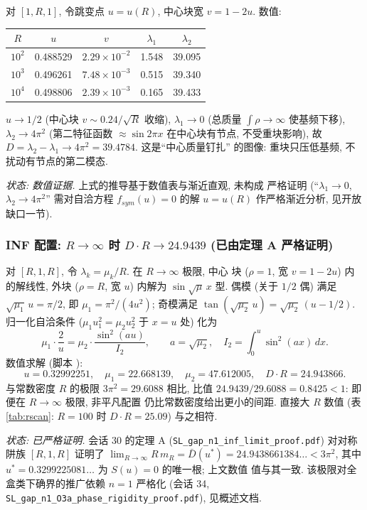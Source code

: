 \documentclass[UTF8]{ctexart}
\begin{document}
对 $[1, R, 1]$, 令跳变点 $u = u(R)$, 中心块宽 $v = 1 - 2u$. 数值:
\begin{center}
\begin{tabular}{c|cccc}
	$R$ & $u$ & $v$ & $\lambda_1$ & $\lambda_2$ \\\hline
	$10^2$ & 0.488529 & $2.29\times10^{-2}$ & 1.548 & 39.095\\
	$10^3$ & 0.496261 & $7.48\times10^{-3}$ & 0.515 & 39.340\\
	$10^4$ & 0.498806 & $2.39\times10^{-3}$ & 0.165 & 39.433\\
\end{tabular}
\end{center}
$u \to 1/2$ (中心块 $v \sim 0.24/\sqrt{R}$ 收缩), $\lambda_1 \to 0$
(总质量 $\int\rho \to \infty$ 使基频下移), $\lambda_2 \to 4\pi^2$
(第二特征函数 $\approx \sin 2\pi x$ 在中心块有节点, 不受重块影响),
故 $D = \lambda_2 - \lambda_1 \to 4\pi^2 = 39.4784$. 这是``中心质量钉扎''
的图像: 重块只压低基频, 不扰动有节点的第二模态.

\noindent\emph{状态: 数值证据.} 上式的推导基于数值表与渐近直观, 未构成
严格证明 (``$\lambda_1\to0$, $\lambda_2\to4\pi^2$'' 需对自洽方程
$f_{sym}(u)=0$ 的解 $u=u(R)$ 作严格渐近分析, 见开放缺口一节).

\subsubsection{INF 配置: \texorpdfstring{$R \to \infty$}{R-inf} 时 \texorpdfstring{$D\cdot R \to 24.9439$}{DR-24.9439} (已由定理 A 严格证明)}

对 $[R, 1, R]$, 令 $\lambda_k = \mu_k/R$. 在 $R \to \infty$ 极限, 中心
块 ($\rho = 1$, 宽 $v = 1 - 2u$) 内的解线性, 外块 ($\rho = R$, 宽 $u$)
内解为 $\sin\sqrt{\mu}\,x$ 型. 偶模 (关于 $1/2$ 偶) 满足
$\sqrt{\mu_1}\,u = \pi/2$, 即 $\mu_1 = \pi^2/(4u^2)$; 奇模满足
$\tan(\sqrt{\mu_2}\,u) = \sqrt{\mu_2}\,(u - 1/2)$. 归一化自洽条件
($\mu_1 u_1^2 = \mu_2 u_2^2$ 于 $x = u$ 处) 化为
\[
	\mu_1 \cdot \frac{2}{u} = \mu_2 \cdot \frac{\sin^2(a u)}{I_2},
	\qquad a = \sqrt{\mu_2}, \quad
	I_2 = \int_0^u \sin^2(a x)\, dx.
\]
数值求解 (脚本 ):
\[
	u = 0.32992251, \quad \mu_1 = 22.668139, \quad
	\mu_2 = 47.612005, \quad D\cdot R = 24.943866.
\]
与常数密度 $R$ 的极限 $3\pi^2 = 29.6088$ 相比, 比值
$24.9439/29.6088 = 0.8425 < 1$: 即便在 $R \to \infty$ 极限, 非平凡配置
仍比常数密度给出更小的间距. 直接大 $R$ 数值 (表 \ref{tab:rscan}:
$R=100$ 时 $D \cdot R = 25.09$) 与之相符.

\noindent\emph{状态: 已严格证明.} 会话 30 的定理 A
(\texttt{SL\_gap\_n1\_inf\_limit\_proof.pdf}) 对对称阱族 $[R,1,R]$
证明了 $\lim_{R\to\infty} R\,m_R = \bar D(u^*) = 24.9438661384\ldots <
3\pi^2$, 其中 $u^* = 0.3299225081\ldots$ 为 $S(u)=0$ 的唯一根; 上文数值
值与其一致. 该极限对全盒类下确界的推广依赖 $n=1$ 严格化 (会话 34,
\texttt{SL\_gap\_n1\_O3a\_phase\_rigidity\_proof.pdf}), 见概述文档.
\end{document}
